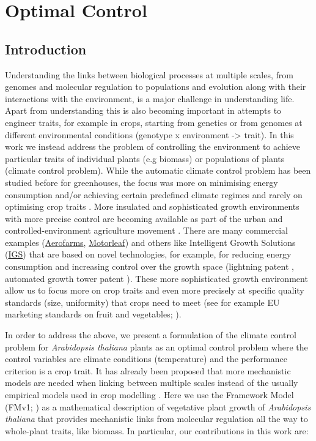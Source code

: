 \documentclass[phd]{infthesis}
\begin{document}
\chapter{Optimal Control}
\label{chp:oc}

\section{Introduction}
Understanding the links between biological processes at multiple scales, from
genomes and molecular regulation to populations and evolution along with their
interactions with the environment, is a major challenge in understanding
life. Apart from understanding this is also becoming important in attempts to
engineer traits, for example in crops, starting from genetics or from genomes at
different environmental conditions (genotype x environment ->
trait). In this work we instead address the problem of controlling the
environment to achieve particular traits of individual plants (e.g biomass) or
populations of plants (climate control problem). While the automatic climate
control problem has been studied before for greenhouses, the focus was more on
minimising energy consumption and/or achieving certain predefined climate
regimes and rarely on optimising crop traits \citep{Chalabi1996,
udinktenCate1983, Challa_1990, Aaslyng2003}. More insulated and sophisticated
growth environments with more precise control are becoming available as part of
the urban and controlled-environment agriculture movement \citep{mok_strawberry_2014, despommier_farming_2013}. There are many
commercial examples (\href{https://aerofarms.com/}{Aerofarms},
\href{https://motorleaf.com/}{Motorleaf}) and others like Intelligent Growth
Solutions (\href{https://www.intelligentgrowthsolutions.com/}{IGS}) that are based on
novel technologies, for example, for reducing energy consumption and increasing
control over the growth space (lightning patent \citep{aykroyd_novel_2016},
automated growth tower patent \citep{aykroyd_automated_2018}). These more
sophisticated growth environment allow us to focus more on crop traits and even
more precisely at specific quality standards (size, uniformity) that crops need
to meet (see for example EU marketing standards on fruit and vegetables;
\citep{eu-543-2011}).

In order to address the above, we present a formulation of the climate control
problem for \textit{Arabidopsis thaliana} plants as an optimal control problem
\citep{kirk_optimal_2012} where the control variables are climate conditions
(temperature) and the performance criterion is a crop trait. It has already been
proposed that more mechanistic models are needed when linking between multiple
scales instead of the usually empirical models used in crop modelling
\citep{yin_role_2004, yin_modelling_2010}. Here we use the Framework Model (FMv1;
\citep{chew2014multiscale}) as a mathematical description of vegetative plant
growth of \textit{Arabidopsis thaliana} that provides mechanistic links from
molecular regulation all the way to whole-plant traits, like biomass. In
particular, our contributions in this work are:
\end{document}
